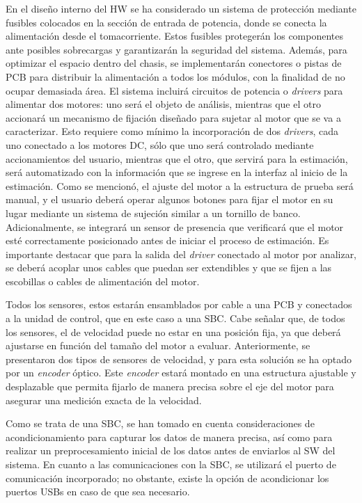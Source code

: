     En el diseño interno del \ac{HW} se ha considerado un sistema de protección mediante fusibles colocados en la sección de entrada de potencia, donde se conecta la alimentación desde el tomacorriente. Estos fusibles protegerán los componentes ante posibles sobrecargas y garantizarán la seguridad del sistema. Además, para optimizar el espacio dentro del chasis, se implementarán conectores o pistas de \ac{PCB}  para distribuir la alimentación a todos los módulos, con la finalidad de no ocupar demasiada área.
    El sistema incluirá circuitos de potencia o \textit{drivers} para alimentar dos motores: uno será el objeto de análisis, mientras que el otro accionará un mecanismo de fijación diseñado para sujetar al motor que se va a caracterizar. Esto requiere como mínimo la incorporación de dos \textit{drivers}, cada uno conectado a los motores \ac{DC}, sólo que uno será controlado mediante accionamientos del usuario, mientras que el otro, que servirá para la estimación, será automatizado con la información que se ingrese en la interfaz al inicio de la estimación. Como se mencionó, el ajuste del motor a la estructura de prueba será manual, y el usuario deberá operar algunos botones para fijar el motor en su lugar mediante un sistema de sujeción similar a un tornillo de banco. Adicionalmente, se integrará un sensor de presencia que verificará que el motor esté correctamente posicionado antes de iniciar el proceso de estimación. Es importante destacar que para la salida del \textit{driver} conectado al motor por analizar, se deberá acoplar unos cables que puedan ser extendibles y que se fijen a las escobillas o cables de alimentación del motor.
    
    Todos los sensores, estos estarán ensamblados por cable a una \ac{PCB} y conectados a la unidad de control, que en este caso a una \ac{SBC}. Cabe señalar que, de todos los sensores, el de velocidad puede no estar en una posición fija, ya que deberá ajustarse en función del tamaño del motor a evaluar. Anteriormente, se presentaron dos tipos de sensores de velocidad, y para esta solución se ha optado por un \textit{encoder} óptico. Este \textit{encoder} estará montado en una estructura ajustable y desplazable que permita fijarlo de manera precisa sobre el eje del motor para asegurar una medición exacta de la velocidad.
    
    Como se trata de una \ac{SBC}, se han tomado en cuenta consideraciones de acondicionamiento para capturar los datos de manera precisa, así como para realizar un preprocesamiento inicial de los datos antes de enviarlos al \ac{SW} del sistema. En cuanto a las comunicaciones con la \ac{SBC}, se utilizará el puerto de comunicación incorporado; no obstante, existe la opción de acondicionar los puertos USBs en caso de que sea necesario.
    
